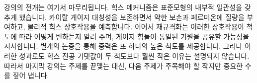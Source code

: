 \begin{classroomqa}
\end{classroomqa}

강의의 전개는 여기서 마무리됩니다. 힉스 메커니즘은 표준모형의 내부적 일관성을 갖추게 했습니다. 카이랄 게이지 대칭성을 보존하면서 약한 보손과 페르미온에 질량을 부여하고, 물리적 힉스 상호작용을 예측합니다. 이어서 재규격화는 이러한 상호작용이 척도에 따라 어떻게 변하는지 알려 주며, 게이지 힘들이 통일된 기원을 공유할 가능성을 시사합니다. 별개의 논증을 통해 중력은 또 하나의 높은 척도를 제공합니다. 그러나 이러한 성과로도 힉스 진공 기댓값이 두 척도보다 훨씬 작은 이유는 설명되지 않습니다. 따라서 마지막 강의는 주제를 끝맺는 대신, 다음 주제가 주목해야 할 작지만 중요한 수를 짚어 냅니다.